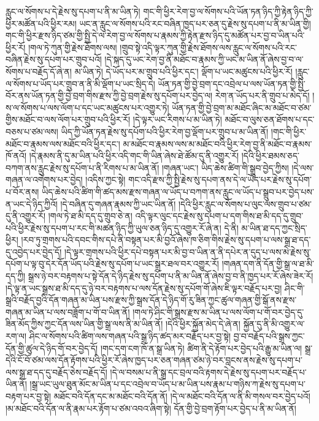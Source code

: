རླུང་ལ་སོགས་པ་དེ་རྗེས་སུ་དཔག་པ་ནི་མ་ཡིན་ཏེ། གང་གི་ཕྱིར་རེག་བྱ་ལ་སོགས་པའི་ཡོན་ཏན་ཉིད་ཀྱི་རྟེན་ཉིད་ཀྱི་ཕྱིར་མཚོན་པའི་ཕྱིར་རམ། ཡང་ན་རླུང་ལ་སོགས་པའི་རང་བཞིན་ཁྱད་པར་ཅན་དུ་རྗེས་སུ་དཔག་པ་ནི་མ་ཡིན་གྱི། གང་གི་ཕྱིར་རྫས་ཉིད་ཙམ་གྱི་སྤྱི་དེ་ལ་རེག་བྱ་ལ་སོགས་པ་རྣམས་ཀྱི་རྟེན་རྫས་ཉིད་དུ་མཚོན་པར་བྱ་བ་ཡིན་པའི་ཕྱིར་རོ། །གལ་ཏེ་ཀུན་གྱི་རྗེས་ཐོགས་ལས། །གྲུབ་སྟེ་འདི་ལྟར་ཀུན་གྱི་རྗེས་ཐོགས་ལས་རླུང་ལ་སོགས་པའི་རང་བཞིན་རྗེས་སུ་དཔག་པར་གྲུབ་པའོ། །དེ་སྐད་དུ་ཡང་རེག་བྱ་ནི་མཐོང་བ་རྣམས་ཀྱི་ཡང་མ་ཡིན་ནོ་ཞེས་བྱ་བ་ལ་སོགས་པ་བརྗོད་དོ་ཞེ་ན། མ་ཡིན་ཏེ། དེ་ཡོད་པར་མ་གྲུབ་པའི་ཕྱིར་དང་། ལྡོག་པ་ཡང་མཚུངས་པའི་ཕྱིར་རོ། །རླུང་ལ་སོགས་པ་ཡོད་པར་གྲུབ་ན་ནི་མི་ལྡོག་པ་ཡང་སྲིད་དེ། ཡོན་ཏན་གྱི་བྱེ་བྲག་དང་འབྲེལ་པ་ལས་ཡོན་ཏན་གྱི་སྤྱི་བོར་ནས་ཡོན་ཏན་གྱི་བྱེ་བྲག་གིས་རྫས་ཀྱི་བྱེ་བྲག་རྗེས་སུ་དཔོག་པར་བྱེད་ལ། རེག་ན་ཡོད་པར་ནི་གྲུབ་པ་མེད་དོ། །ས་ལ་སོགས་པ་ལས་ལོག་པ་དང་ཡང་མཚུངས་པར་འགྱུར་ཏེ། ཡོན་ཏན་གྱི་བྱེ་བྲག་མ་མཐོང་ཞིང་མ་མཐོང་བ་ཙམ་གྱིས་མཐོང་བ་ལས་ལོག་པར་གྲུབ་པའི་ཕྱིར་རོ། །དེ་ལྟར་ཡང་རིགས་པ་མ་ཡིན་ཏེ། མཐོང་བ་ལུས་ཅན་ཐོགས་པ་དང་བཅས་པ་ཙམ་ལས། ཡིད་ཀྱི་ཡོན་ཏན་རྗེས་སུ་དཔོག་པའི་ཕྱིར་རེག་བྱ་ལྡོག་པར་གྲུབ་པ་མ་ཡིན་ནོ། །གང་གི་ཕྱིར་མཐོང་བ་རྣམས་ལས་མཐོང་བའི་ཕྱིར་དང་། མ་མཐོང་བ་རྣམས་ལས་མ་མཐོང་བའི་ཕྱིར་རེག་བྱ་ནི་མཐོང་བ་རྣམས་ཁོ་ནའོ། །དེ་རྣམས་ནི་དུ་མ་ཡིན་པའི་ཕྱིར་འདི་གང་གི་ཡིན་ཞེས་ཐེ་ཚོམ་དུ་ནི་འགྱུར་རོ། །དེའི་ཕྱིར་ཐམས་ཅད་བཀག་ནས་རླུང་རྗེས་སུ་དཔོག་པ་ནི་རིགས་པ་མ་ཡིན་ནོ། །གཞན་ཡང་། ཡིད་ཆེས་ཚིག་གི་སྒྲུབ་བྱེད་ཀྱིས། །དེ་ལས་གཞན་ལ་འགེགས་པར་བྱེད། །འདིས་ཀྱང་སྟེ། གང་འདི་རྫས་ཀྱི་སྤྱི་རྗེས་སུ་དཔག་ནས་དེ་ལ་ཡོད་པར་རྗེས་སུ་དཔོག་པ་བོར་ནས། ཡིད་ཆེས་པའི་ཚིག་གི་ཚད་མས་རྫས་གཞན་ལ་ཡོད་པ་བཀག་ནས་རླུང་ལ་ཡོད་པ་སྒྲུབ་པར་བྱེད་པས་ན་ཡང་དེ་ཉིད་ཀྱིའོ། །དེ་བཞིན་དུ་གཞན་རྣམས་ཀྱི་ཡང་ཡིན་ནོ། །དེའི་ཕྱིར་རླུང་ལ་སོགས་པ་ལུང་ལས་གྲུབ་པ་ཙམ་དུ་ནི་འགྱུར་རོ། །གལ་ཏེ་ཐ་མི་དད་དུ་གྲུབ་ཅེ་ན། འདི་ལྟར་ལུང་དང་རྗེས་སུ་དཔག་པ་དག་གིས་ཐ་མི་དད་དུ་གྲུབ་པའི་ཕྱིར་རྗེས་སུ་དཔག་པ་རང་གི་མཚན་ཉིད་ཀྱི་ཡུལ་ཅན་ཉིད་དུ་འགྱུར་རོ་ཞེ་ན། དེ་ནི། མ་ཡིན་ཐ་དད་ཀྱང་སྲིད་ཕྱིར། །རབ་ཏུ་གྲགས་པའི་དབང་གིས་དཔེ་ནི་བསྟན་པར་མི་བྱའོ་ཞེས་ཁ་ཅིག་གིས་རྗེས་སུ་དཔག་པ་ལས་སྒྲ་ཐ་དད་དུ་འབྱེད་པར་བྱེད་དོ། །དེ་ལྟར་གྲགས་པའི་ཕྱིར་དཔེ་བསྟན་པར་མི་བྱ་བ་ཡིན་ན་ནི་དཔེར་ན་དུད་པ་ལས་མེ་རྗེས་སུ་དཔོག་པ་ལྟ་བུ་དེར་དོན་ཡོད་པའི་རྗེས་སུ་དཔོག་པ་ཡང་སྒྲར་ཐལ་བར་འགྱུར་རོ། །གཞན་དག་ནི་དོན་གྱི་སྒྲ་ལ་ཐ་མི་དད་ཀྱི། སྒྲས་ཉེ་བར་བརྟགས་པ་སྟེ་དོན་དེ་ཉིད་རྗེས་སུ་དཔོག་པ་ནི་མ་ཡིན་ནོ་ཞེས་བྱ་བ་ནི་ཁྱད་པར་རོ་ཞེས་ཟེར་རོ། །དེ་ལྟ་ན་ཡང་སྒྲས་ཐ་མི་དད་དུ་ཉེ་བར་བརྟགས་པ་ལས་དོན་རྗེས་སུ་དཔོག་གོ་ཞེས་ཇི་ལྟར་བརྗོད་པར་བྱ། ཤིང་གི་སྒྲའི་བརྗོད་བྱའི་དོན་གཞན་མ་ཡིན་པས་རྫས་ཀྱི་སྒྲས་དོན་དེ་ཉིད་གོ་རུ་ཟིན་ཀྱང་ཚུལ་གཞན་གྱི་སྒོ་ནས་རྫས་གཞན་མ་ཡིན་པ་ལས་བཟློག་པ་གོ་བ་ཡིན་ནོ། །གལ་ཏེ་ཤིང་གི་སྒྲས་རྫས་མ་ཡིན་པ་ལས་ལོག་པ་གོ་བར་བྱེད་དུ་ཟིན་མོད་ཀྱིས་ཀྱང་དོན་ལས་ཡིན་གྱི་སྒྲ་ལས་ནི་མ་ཡིན་ནོ། །དེའི་ཕྱིར་སྐྱོན་མེད་དེ་ཞེ་ན། སྐྱོན་དུ་ནི་མི་འགྱུར་ལ་རག་ལ། ཤིང་ལ་སོགས་པའི་ཚིག་ལས་གཞན་པའི་སྒྲ་ཉིད་ཚད་མར་བརྗོད་པར་བྱ་སྟེ། བྱ་བ་བརྗོད་པའི་སྒྲས་ཀྱང་དོན་གྱི་ཚུལ་དེ་ཉིད་གོ་བར་བྱེད་དོ། །གང་དག་ངག་ཁོ་ན་སྒྲ་ཡིན་ཏེ། ཚིག་ནི་དེ་རྟོག་པར་བྱེད་པའི་རྒྱུ་མ་ཡིན་ལ། སྒྲ་དེའི་ངོ་བོ་ཙམ་ལས་དོན་རྟོགས་པའི་ཕྱིར་རོ་ཞེས་ཁྱད་པར་ཅན་གཞན་ཙམ་ཉེ་བར་བླངས་ནས་རྗེས་སུ་དཔག་པ་ལས་སྒྲ་ཐ་དད་དུ་བརྗོད་ཅེས་བརྗོད་དོ། །དེ་ལ་བསམ་པ་ནི་སྒྲ་དང་བྲལ་བའི་རྟགས་དེ་རྗེས་སུ་དཔག་པར་བརྗོད་པ་ཡིན་ནོ། །སྒྲ་ཡང་ཡུལ་ཐུན་མོང་མ་ཡིན་པ་དང་འབྲེལ་བ་ཡོད་པ་མ་ཡིན་པས་རྣམ་པ་གཉིས་ཀ་རྗེས་སུ་དཔག་པ་བརྟག་པར་བྱ་སྟེ། མཐོང་བའི་དོན་དང་མ་མཐོང་བའི་དོན་ནོ། །དེ་ལ་མཐོང་བའི་དོན་ལ་ནི་མི་གསལ་བར་བྱེད་པའོ། །མ་མཐོང་བའི་དོན་ལ་ནི་རྣམ་པར་རྟོག་པ་ཙམ་འབའ་ཞིག་སྟེ། དོན་གྱི་བྱེ་བྲག་རྟོག་པར་བྱེད་པ་ནི་མ་ཡིན་ནོ། 